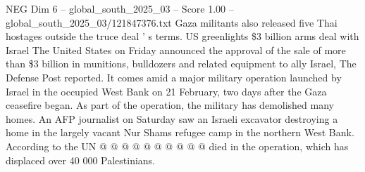 \begin{textsample}{NEG Dim 6 – global\_south\_2025\_03 – Score 1.00 – global\_south\_2025\_03/121847376.txt}
Gaza militants also released five Thai hostages outside the truce deal ' s terms.
US greenlights \$3 billion arms deal with Israel The United States on Friday announced the approval of the sale of more than \$3 billion in munitions, bulldozers and related equipment to ally Israel, The Defense Post reported.
It comes amid a major military operation launched by Israel in the occupied West Bank on 21 February, two days after the Gaza ceasefire began.
As part of the operation, the military has demolished many homes.
An AFP journalist on Saturday saw an Israeli excavator destroying a home in the largely vacant Nur Shams refugee camp in the northern West Bank.
According to the UN @ @ @ @ @ @ @ @ @ @ died in the operation, which has displaced over 40 000 Palestinians.

\end{textsample}

